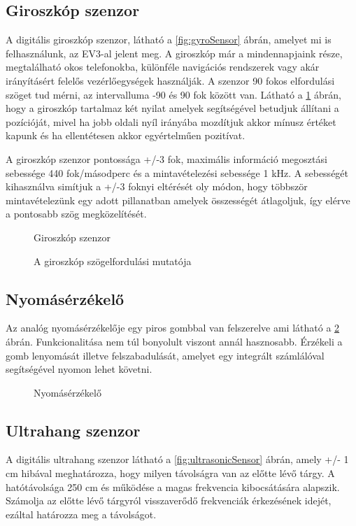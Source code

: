 \subsection{Giroszkóp szenzor}

A digitális giroszkóp szenzor, látható a \ref{fig:gyroSensor} ábrán, amelyet mi is felhasználunk, az EV3-al jelent meg. A giroszkóp már a mindennapjaink része, megtalálható okos telefonokba, különféle navigációs rendszerek vagy akár irányításért felelős vezérlőegységek használják. A szenzor 90 fokos elfordulási szöget tud mérni, az intervalluma -90 és 90 fok között van. Látható a \ref{fig:gyroFok} ábrán, hogy a giroszkóp tartalmaz két nyilat amelyek segítségével betudjuk állítani a pozícióját, mivel ha jobb oldali nyíl irányába mozdítjuk akkor mínusz értéket kapunk és ha ellentétesen akkor egyértelműen pozitívat. 

A giroszkóp szenzor pontossága +/-3 fok, maximális információ megosztási sebessége 440 fok/másodperc és a mintavételezési sebessége 1 kHz. A sebességét kihasználva simítjuk  a +/-3 foknyi eltérését oly módon, hogy többször mintavételezünk egy adott pillanatban amelyek összességét átlagoljuk, így elérve a pontosabb szög megközelítését.

\begin{figure}[!htb]
	\centering
	\label{fig:gyroSensor}
	\caption{Giroszkóp szenzor}
	\endminipage
	\label{fig:gyroFok}
	\caption{A giroszkóp szögelfordulási mutatója}
	\endminipage
\end{figure}

\subsection{Nyomásérzékelő}
Az analóg nyomásérzékelője egy piros gombbal van felszerelve ami látható a \ref{fig:touchSensor} ábrán. Funkcionalitása nem túl bonyolult viszont annál hasznosabb. Érzékeli a gomb lenyomását illetve felszabadulását, amelyet egy integrált számlálóval segítségével nyomon lehet követni. 

\begin{figure}[!htb]
	\label{fig:touchSensor}
	\centering
	\caption{Nyomásérzékelő}
\end{figure}

\subsection{Ultrahang szenzor}
A digitális ultrahang szenzor látható a \ref{fig:ultrasonicSensor} ábrán, amely +/- 1 cm hibával meghatározza, hogy milyen távolságra van az előtte lévő tárgy. A hatótávolsága 250 cm és működése a magas frekvencia kibocsátására  alapszik. Számolja az előtte lévő tárgyról visszaverődő frekvenciák érkezésének idejét, ezáltal határozza meg a távolságot. 

